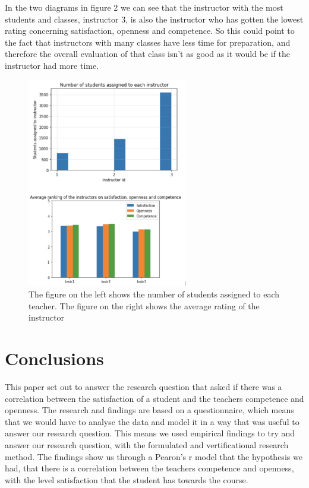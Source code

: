 \documentclass[twocolumn]{article}
\begin{document}
In the two diagrams in figure 2 we can see that the instructor with the most students and classes, instructor 3, is also the instructor who has gotten the lowest rating concerning satisfaction, openness and competence. 
So this could point to the fact that instructors with many classes have less time for preparation, and therefore the overall evaluation of that class isn’t as good as it would be if the instructor had more time.
\begin{figure}
\centering
\includegraphics[width=7cm]{Figures/pictures/billede2.png}
\caption{The figure on the left shows the number of students assigned to each teacher. The figure on the right shows the average rating of the instructor}
\label{fig:pearson}
\end{figure}


\section{Conclusions}\label{section-applications}
This paper set out to answer the research question that asked if there was a correlation between the satisfaction of a student and the teachers competence and openness. The research and findings are based on a questionnaire, which means that we would have to analyse the data and model it in a way that was useful to answer our research question. This means we used empirical findings to try and answer our research question, with the formulated and vertificational research method. The findings show us through a Pearon’s r model that the hypothesis we had, that there is a correlation between the teachers competence and openness, with the level satisfaction that the student has towards the course.
\end{document}

